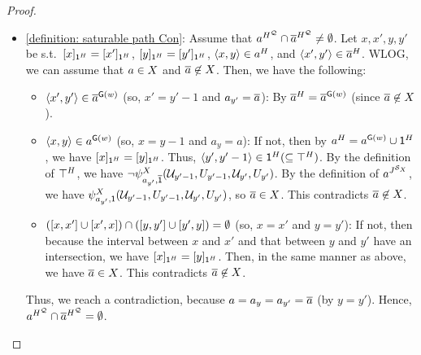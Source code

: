 \begin{proof}
\begin{itemize}
              \item \ref{definition: saturable path Con}:
                    Assume that $a^{\graph[2]^{\FillQ}} \cap \com{a}^{\graph[2]^{\FillQ}} \neq \emptyset$.
                    Let $x, x', y, y'$ be s.t.\
                    $\quo{x}_{\id^{\graph[2]}} = \quo{x'}_{\id^{\graph[2]}}$,
                    $\quo{y}_{\id^{\graph[2]}} = \quo{y'}_{\id^{\graph[2]}}$,
                    $\tuple{x, y} \in a^{\graph[2]}$, and $\tuple{x', y'} \in \com{a}^{\graph[2]}$.
                    WLOG, we can assume that $a \in X$ and $\overline{a} \not\in X$.
                    Then, we have the following:
                    \begin{itemize}
                     \item $\tuple{x', y'} \in \com{a}^{\const{\graph}(\word)}$ (so, $x' = y' - 1$ and $a_{y'} = \overline{a}$): By $\com{a}^{\graph[2]} = \com{a}^{\const{\graph}(\word)}$ (since $\overline{a} \not\in X$).

                     \item $\tuple{x, y} \in a^{\const{\graph}(\word)}$ (so, $x = y - 1$ and $a_{y} = a$):
                     If not, then by $a^{\graph[2]} = a^{\const{\graph}(\word)} \cup \id^{\graph[2]}$, we have $\quo{x}_{\id^{\graph[2]}} = \quo{y}_{\id^{\graph[2]}}$.
                     Thus, $\tuple{y', y' - 1} \in \id^{\graph[2]} (\subseteq \top^{\graph[2]})$.
                     By the definition of $\top^{\graph[2]}$, we have $\lnot \fml[2]_{a_{y'}, \com{\id}}^{\Aset}(\mathcal{U}_{y'-1}, U_{y'-1}, \mathcal{U}_{y'}, U_{y'})$.
                     By the definition of $a^{\graph[3]^{\FillS_{X}}}$, we have $\fml[2]_{a_{y'}, \id}^{\Aset}(\mathcal{U}_{y'-1}, U_{y'-1}, \mathcal{U}_{y'}, U_{y'})$,
                     so $\overline{a} \in X$.
                     This contradicts $\overline{a} \not\in X$.
                  
                     \item $([x, x'] \cup [x', x]) \cap ([y, y'] \cup [y', y]) = \emptyset$ (so, $x = x'$ and $y = y'$):
                     If not, then because the interval between $x$ and $x'$ and that between $y$ and $y'$ have an intersection,
                     we have $\quo{x}_{\id^{\graph[2]}} = \quo{y}_{\id^{\graph[2]}}$.
                     Then, in the same manner as above, we have $\overline{a} \in X$.
                     This contradicts $\overline{a} \not\in X$.
                    \end{itemize}
                     Thus, we reach a contradiction, because $a = a_{y} = a_{y'} = \overline{a}$ (by $y = y'$).
                     Hence, $a^{\graph[2]^{\FillQ}} \cap \com{a}^{\graph[2]^{\FillQ}} = \emptyset$.


\end{itemize}
\end{proof}
